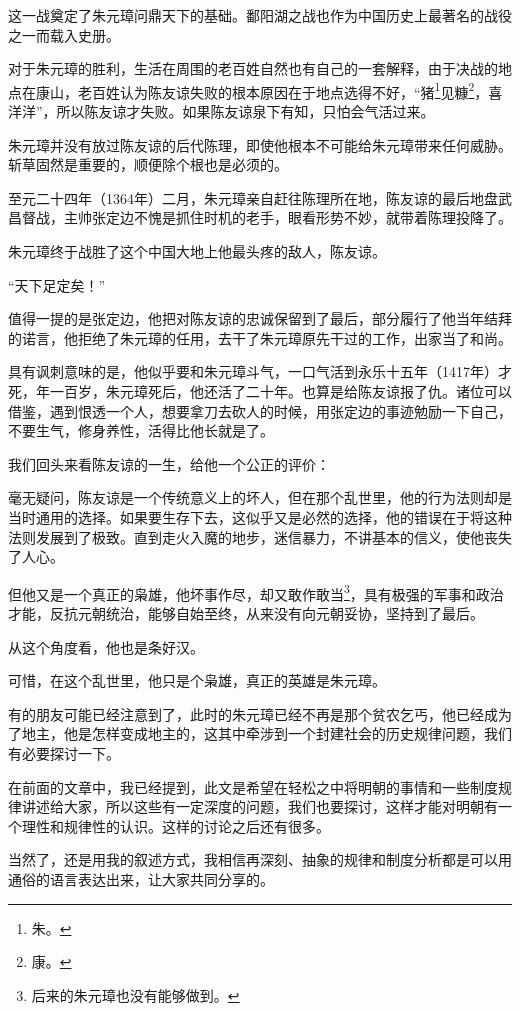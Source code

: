 \begin{multicols}{\theparacolNo}
		这一战奠定了朱元璋问鼎天下的基础。鄱阳湖之战也作为中国历史上最著名的战役之一而载入史册。

		对于朱元璋的胜利，生活在周围的老百姓自然也有自己的一套解释，由于决战的地点在康山，老百姓认为陈友谅失败的根本原因在于地点选得不好，“猪\footnote{朱。}见糠\footnote{康。}，喜洋洋”，所以陈友谅才失败。如果陈友谅泉下有知，只怕会气活过来。

		朱元璋并没有放过陈友谅的后代陈理，即使他根本不可能给朱元璋带来任何威胁。斩草固然是重要的，顺便除个根也是必须的。

		至元二十四年（1364年）二月，朱元璋亲自赶往陈理所在地，陈友谅的最后地盘武昌督战，主帅张定边不愧是抓住时机的老手，眼看形势不妙，就带着陈理投降了。

		朱元璋终于战胜了这个中国大地上他最头疼的敌人，陈友谅。

		“天下足定矣！”

		值得一提的是张定边，他把对陈友谅的忠诚保留到了最后，部分履行了他当年结拜的诺言，他拒绝了朱元璋的任用，去干了朱元璋原先干过的工作，出家当了和尚。

		具有讽刺意味的是，他似乎要和朱元璋斗气，一口气活到永乐十五年（1417年）才死，年一百岁，朱元璋死后，他还活了二十年。也算是给陈友谅报了仇。诸位可以借鉴，遇到恨透一个人，想要拿刀去砍人的时候，用张定边的事迹勉励一下自己，不要生气，修身养性，活得比他长就是了。

		我们回头来看陈友谅的一生，给他一个公正的评价：

		毫无疑问，陈友谅是一个传统意义上的坏人，但在那个乱世里，他的行为法则却是当时通用的选择。如果要生存下去，这似乎又是必然的选择，他的错误在于将这种法则发展到了极致。直到走火入魔的地步，迷信暴力，不讲基本的信义，使他丧失了人心。

		但他又是一个真正的枭雄，他坏事作尽，却又敢作敢当\footnote{后来的朱元璋也没有能够做到。}，具有极强的军事和政治才能，反抗元朝统治，能够自始至终，从来没有向元朝妥协，坚持到了最后。

		从这个角度看，他也是条好汉。

		可惜，在这个乱世里，他只是个枭雄，真正的英雄是朱元璋。

		有的朋友可能已经注意到了，此时的朱元璋已经不再是那个贫农乞丐，他已经成为了地主，他是怎样变成地主的，这其中牵涉到一个封建社会的历史规律问题，我们有必要探讨一下。

		在前面的文章中，我已经提到，此文是希望在轻松之中将明朝的事情和一些制度规律讲述给大家，所以这些有一定深度的问题，我们也要探讨，这样才能对明朝有一个理性和规律性的认识。这样的讨论之后还有很多。

		当然了，还是用我的叙述方式，我相信再深刻、抽象的规律和制度分析都是可以用通俗的语言表达出来，让大家共同分享的。


\end{multicols}
